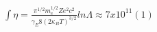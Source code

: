 \begin{align*}
∫\eta=\frac{\pi^{1/2}m^{1/2}_{e}Ze^{2}c^{2}}{\gamma_{E}8(2\kappa_{B}T)^{3/2}} ln\Lambda \approx7 x 10^{11}      (1)
\end{align*}



